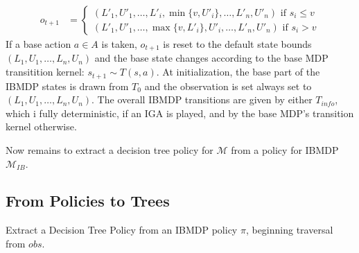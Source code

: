 \begin{definition}
\begin{itemize}
\begin{align*}
    o_{t+1} &= \begin{cases}
        (L'_1, U'_1, \dots , L'_i, \min\{v, U'_i\}, \dots , L'_n, U'_n) \text{ if } s_i \leq v\\
        (L'_1, U'_1, \dots , \max\{v, L'_i\}, U'_i, \dots , L'_n, U'_n) \text{ if } s_i > v
    \end{cases}
\end{align*}
If a base action $a\in A$ is taken, $o_{t+1}$ is reset to the default state bounds $(L_1, U_1,\dots, L_n, U_n)$ and the base state changes according to the base MDP transitition kernel: $s_{t+1}\sim T(s, a)$.
At initialization, the base part of the IBMDP states is drawn from $T_0$ and the observation is set always set to $(L_1, U_1,\dots, L_n, U_n)$.
The overall IBMDP transitions are given by either $T_{info}$, which i fully deterministic, if an IGA is played, and by the base MDP's transition kernel otherwise.
\end{itemize}
\end{definition}
Now remains to extract a decision tree policy for $\mathcal{M}$ from a policy for IBMDP $\mathcal{M}_{IB}$. 

\subsection{From Policies to Trees}
\begin{algorithm}[t]
    
    
    
    \caption{Extract a Decision Tree Policy from an IBMDP policy $\pi$, beginning traversal from $obs$.}\label{alg_extract_tree}
\end{algorithm}

